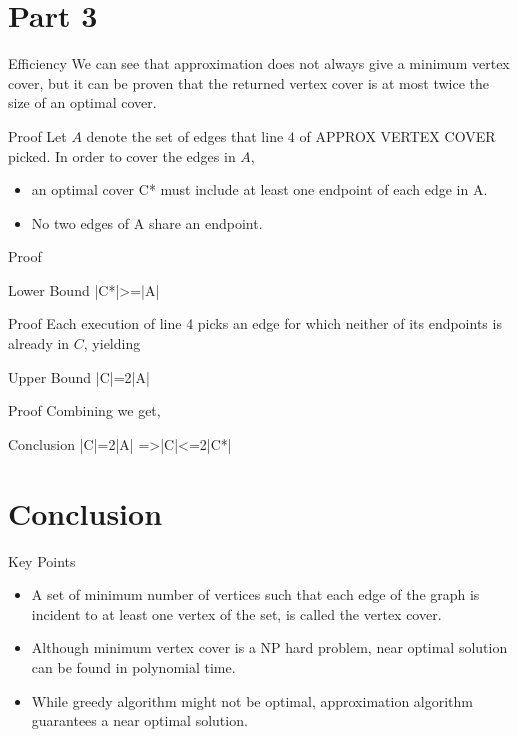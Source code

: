 \documentclass{beamer}
\begin{document}
\section{Part 3}
\begin{frame}{Efficiency}
   We can see that approximation does not always give a minimum vertex cover, but it can be proven that the returned vertex cover is at most twice the size of an optimal cover.
\end{frame}

\begin{frame}{Proof}
    Let $A$ denote the set of edges that line $4$ of APPROX VERTEX COVER picked. In order to cover the edges in $A$,
    \begin{itemize}
        \item an optimal cover C* must include at least one endpoint of each edge in A.\\
        \item No two edges of A share an endpoint.\\
    \end{itemize}
\end{frame}

\begin{frame}{Proof}
    \begin{alertblock}{Lower  Bound}
        |C*|>=|A|
    \end{alertblock}
\end{frame}

\begin{frame}{Proof}
    Each execution of line 4 picks an edge for which neither of its endpoints is already in $C$, yielding 
    \begin{alertblock}{Upper Bound}
        |C|=2|A|
    \end{alertblock}
\end{frame}

\begin{frame}{Proof}
    Combining we get, 
    \begin{alertblock}{Conclusion}
        |C|=2|A|
        =>|C|<=2|C*|
    \end{alertblock}
\end{frame}

\section{Conclusion}
\begin{frame}{Key Points}
    \begin{itemize}
        \item A set of minimum number of vertices such that each edge of the graph is incident to at least one vertex of the set, is called the vertex cover.\\ \pause
        \item Although minimum vertex cover is a NP hard problem, near optimal solution can be found in polynomial time.\\ \pause
        \item While greedy algorithm might not be optimal, approximation algorithm guarantees a near optimal solution.\\ 
    \end{itemize}
\end{frame}
\end{document}
